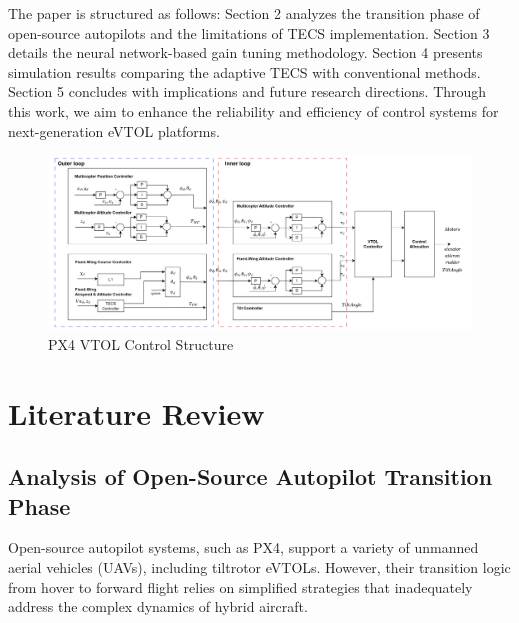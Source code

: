 \documentclass[journal,article,submit,pdftex,moreauthors]{Definitions/mdpi}
\begin{document}
The paper is structured as follows: Section 2 analyzes the transition phase of open-source autopilots and the limitations of TECS implementation. Section 3 details the neural network-based gain tuning methodology. Section 4 presents simulation results comparing the adaptive TECS with conventional methods. Section 5 concludes with implications and future research directions. Through this work, we aim to enhance the reliability and efficiency of control systems for next-generation eVTOL platforms.
\begin{figure}[H]
    \centering
    \includegraphics[width=1\linewidth]{PX4_VTOL_Control_Structure.png}
    \caption{PX4 VTOL Control Structure}
    \label{fig:enter-label}
\end{figure}
\section{Literature Review}
\subsection{Analysis of Open-Source Autopilot Transition Phase}
Open-source autopilot systems, such as PX4, support a variety of unmanned aerial vehicles (UAVs), including tiltrotor eVTOLs. However, their transition logic from hover to forward flight relies on simplified strategies that inadequately address the complex dynamics of hybrid aircraft.
\end{document}
